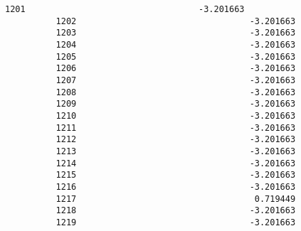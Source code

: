 \documentclass[11pt]{article}
\begin{document}
\begin{Verbatim}[commandchars=\\\{\}]
          1201                                  -3.201663   
          1202                                  -3.201663   
          1203                                  -3.201663   
          1204                                  -3.201663   
          1205                                  -3.201663   
          1206                                  -3.201663   
          1207                                  -3.201663   
          1208                                  -3.201663   
          1209                                  -3.201663   
          1210                                  -3.201663   
          1211                                  -3.201663   
          1212                                  -3.201663   
          1213                                  -3.201663   
          1214                                  -3.201663   
          1215                                  -3.201663   
          1216                                  -3.201663   
          1217                                   0.719449   
          1218                                  -3.201663   
          1219                                  -3.201663   
          

\end{Verbatim}
\end{document}
